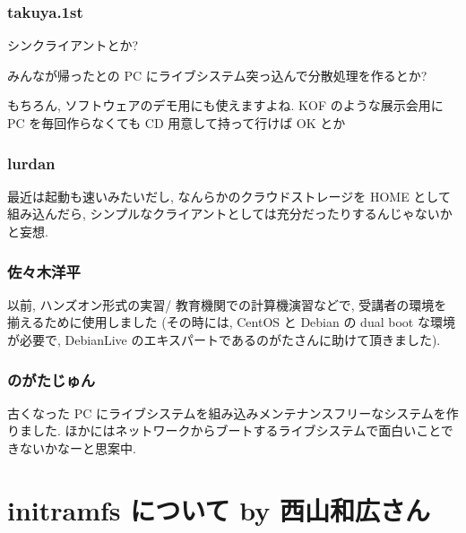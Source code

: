 \documentclass[cjk,dvipdfmx,12pt,%
hyperref={bookmarks=true,bookmarksnumbered=true,bookmarksopen=false,%
colorlinks=false,%
pdftitle={第40回 関西Debian勉強会},%
pdfauthor={倉敷・のがた・佐々木},%
pdfsubject={資料},%
}]{beamer}
\begin{document}
\begin{frame}[fragile]
\frametitle{ takuya.1st }


シンクライアントとか?

みんなが帰ったとの PC にライブシステム突っ込んで分散処理を作るとか?

もちろん, ソフトウェアのデモ用にも使えますよね.
KOF のような展示会用に PC を毎回作らなくても CD 用意して持って行けば OK とか



\end{frame}



\begin{frame}[fragile]
\frametitle{ lurdan }


最近は起動も速いみたいだし, なんらかのクラウドストレージを HOME として組み込んだら, シンプルなクライアントとしては充分だったりするんじゃないかと妄想.


\end{frame}



\begin{frame}[fragile]
\frametitle{ 佐々木洋平 }


以前, ハンズオン形式の実習/ 教育機関での計算機演習などで, 受講者の環境を揃えるために使用しました (その時には, CentOS と Debian の dual boot な環境が必要で, DebianLive のエキスパートであるのがたさんに助けて頂きました).


\end{frame}



\begin{frame}[fragile]
\frametitle{ のがたじゅん }


古くなった PC にライブシステムを組み込みメンテナンスフリーなシステムを作りました. ほかにはネットワークからブートするライブシステムで面白いことできないかなーと思案中.


\end{frame}






\section{initramfs について by 西山和広さん}


\end{document}
